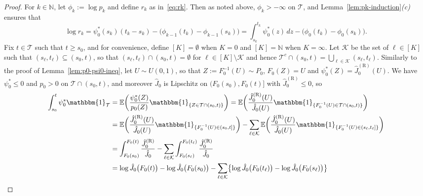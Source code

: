 \documentclass[a4paper]{article}
\newcommand{\N}{\mathbb{N}}
\newcommand{\E}{\mathbb{E}}
\newcommand{\Ind}{\mathbbm{1}}
\theoremstyle{definition}
\begin{document}
\begin{proof}
For $k \in \N$, let $\phi_k := \log p_k$ and define $r_k$ as in~\eqref{eq:rk}. Then as noted above, $\phi_k > -\infty$ on $\mathcal{T}$, and Lemma~\ref{lem:pk-induction}\textit{(c)} ensures that
\begin{equation}
\label{eq:log-rk}
\log r_k = \psi_0^*(s_k)(t_k - s_k) - \bigl(\phi_{k-1}(t_k) - \phi_{k-1}(s_k)\bigr) = \int_{s_k}^{t_k}\psi_0^*(z)\,dz - \bigl(\phi_0(t_k) - \phi_0(s_k)\bigr).
\end{equation}
Fix $t \in \mathcal{T}$ such that $t \geq s_0$, and for convenience, define $[K] = \emptyset$ when $K = 0$ and $[K] = \N$ when $K = \infty$. Let $\mathcal{K}$ be the set of $\ell \in [K]$ such that $(s_\ell,t_\ell) \subseteq (s_0,t)$, so that $(s_\ell,t_\ell) \cap (s_0,t) = \emptyset$ for $\ell \in [K] \setminus \mathcal{K}$ and hence $\mathcal{T}^c \cap (s_0,t) = \bigcup_{\ell \in \mathcal{K}}(s_\ell,t_\ell)$. Similarly to the proof of Lemma~\ref{lem:p0-psi0-ineq}, let $U \sim U(0,1)$, so that $Z := F_0^{-1}(U)\sim P_0$, $F_0(Z) = U$ and $\psi_0^*(Z) = \hat{J}_0^{(\mathrm{R})}(U)$. We have $\psi_0^* \leq 0$ and $p_0 > 0$ on $\mathcal{T} \cap (s_0,t)$, and moreover $\hat{J}_0$ is Lipschitz on $(F_0(s_0),F_0(t)]$ with $\hat{J}_0^{(\mathrm{R})} \leq 0$, so
\begin{align}
\int_{s_0}^t \psi_0^* \Ind_{\mathcal{T}} &= \E\biggl(\frac{\psi_0^*(Z)}{p_0(Z)}\Ind_{\{Z \in \mathcal{T} \cap (s_0,t)\}}\biggr) = \E\biggl(\frac{\hat{J}_0^{(\mathrm{R})}(U)}{\hat{J}_0(U)}\Ind_{\{F_0^{-1}(U) \in \mathcal{T} \cap (s_0,t)\}}\biggr) \notag \\
&= \E\biggl(\frac{\hat{J}_0^{(\mathrm{R})}(U)}{\hat{J}_0(U)}\Ind_{\{F_0^{-1}(U) \in (s_0,t]\}}\biggr) - \sum_{\ell \in \mathcal{K}} \E\biggl(\frac{\hat{J}_0^{(\mathrm{R})}(U)}{\hat{J}_0(U)}\Ind_{\{F_0^{-1}(U) \in (s_\ell,t_\ell]\}}\biggr) \notag \\
&= \int_{F_0(s_0)}^{F_0(t)} \frac{\hat{J}_0^{(\mathrm{R})}}{\hat{J}_0} - \sum_{\ell \in \mathcal{K}} \int_{F_0(s_\ell)}^{F_0(t_\ell)} \frac{\hat{J}_0^{(\mathrm{R})}}{\hat{J}_0} \notag \\
&= \log\hat{J}_0\bigl(F_0(t)\bigr) - \log\hat{J}_0\bigl(F_0(s_0)\bigr) - \sum_{\ell \in \mathcal{K}} \bigl\{\log\hat{J}_0\bigl(F_0(t_\ell)\bigr) - \log\hat{J}_0\bigl(F_0(s_\ell)\bigr)\bigr\} \notag \\

\end{align}
\end{proof}
\end{document}
